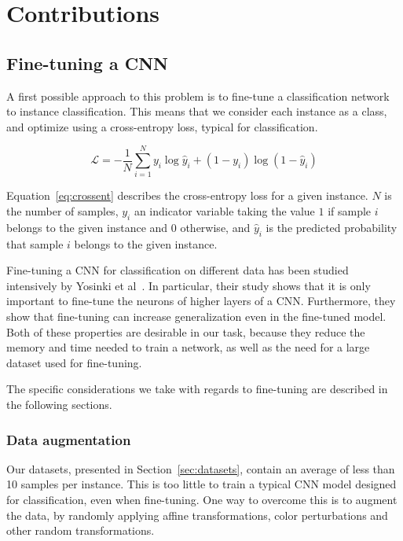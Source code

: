 

\chapter{Contributions}
\section{Fine-tuning a CNN}\label{sec:finetuning}
A first possible approach to this problem is to fine-tune
a classification network to instance classification. This means that
we consider each instance as a class, and optimize using a cross-entropy
loss, typical for classification.

\begin{equation}\label{eq:crossent}
\mathcal{L} = - \frac{1}{N}
\sum_{i=1}^N y_i \log \hat{y}_i + (1-y_i) \log (1-\hat{y}_i)
\end{equation}

Equation~\ref{eq:crossent} describes the cross-entropy loss for a
given instance. $N$ is the number of samples, $y_i$ an indicator
variable taking the value $1$ if sample $i$ belongs to the given
instance and $0$ otherwise, and $\hat{y}_i$ is the predicted probability
that sample $i$ belongs to the given instance.

Fine-tuning a CNN for classification on different data has been studied
intensively by Yosinki et al~\cite{yosinski_how_2014}. In particular,
their study shows that it is only important to fine-tune the neurons
of higher layers of a CNN. Furthermore, they show that
fine-tuning can increase generalization even in the fine-tuned model.
Both of these properties are desirable in our task, because they reduce
the memory and time needed to train a network, as well as the need
for a large dataset used for fine-tuning.

The specific considerations we take with regards to fine-tuning are
described in the following sections.

\subsection{Data augmentation}
Our datasets, presented in Section~\ref{sec:datasets},
contain an average of less than 10 samples per instance. This is too little
to train a typical CNN model designed for classification, even when
fine-tuning.
One way to overcome this is to augment the data, by randomly applying
affine transformations, color perturbations and other random transformations.

